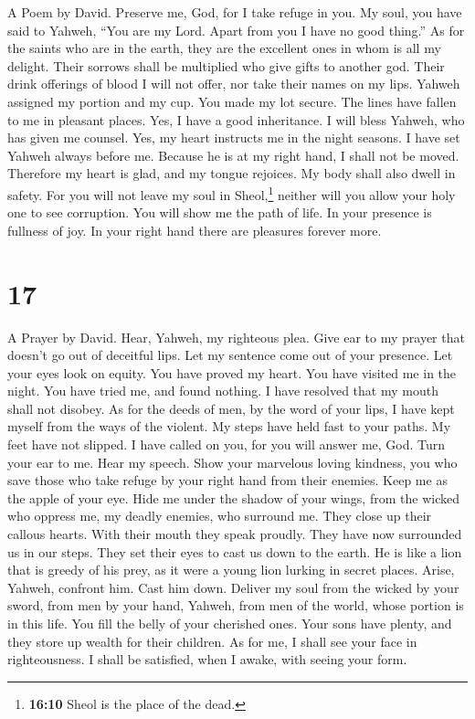 A Poem by David.  Preserve me, God, for I take refuge in
you.  My soul, you have said to Yahweh, ``You are my Lord.
Apart from you I have no good thing.''  As for the saints
who are in the earth, they are the excellent ones in whom is all my
delight.  Their sorrows shall be multiplied who give gifts
to another god. Their drink offerings of blood I will not offer, nor
take their names on my lips.  Yahweh assigned my portion
and my cup. You made my lot secure.  The lines have fallen
to me in pleasant places. Yes, I have a good inheritance. 
I will bless Yahweh, who has given me counsel. Yes, my heart instructs
me in the night seasons.  I have set Yahweh always before
me. Because he is at my right hand, I shall not be moved. 
Therefore my heart is glad, and my tongue rejoices. My body shall also
dwell in safety.  For you will not leave my soul in
Sheol,\footnote{\textbf{16:10} Sheol is the place of the dead.} neither
will you allow your holy one to see corruption.  You will
show me the path of life. In your presence is fullness of joy. In your
right hand there are pleasures forever more.

\hypertarget{section-16}{%
\section{17}\label{section-16}}

A Prayer by David.  Hear, Yahweh, my righteous plea. Give
ear to my prayer that doesn't go out of deceitful lips. 
Let my sentence come out of your presence. Let your eyes look on equity.
 You have proved my heart. You have visited me in the
night. You have tried me, and found nothing. I have resolved that my
mouth shall not disobey.  As for the deeds of men, by the
word of your lips, I have kept myself from the ways of the violent.
 My steps have held fast to your paths. My feet have not
slipped.  I have called on you, for you will answer me,
God. Turn your ear to me. Hear my speech.  Show your
marvelous loving kindness, you who save those who take refuge by your
right hand from their enemies.  Keep me as the apple of
your eye. Hide me under the shadow of your wings,  from
the wicked who oppress me, my deadly enemies, who surround me.
 They close up their callous hearts. With their mouth
they speak proudly.  They have now surrounded us in our
steps. They set their eyes to cast us down to the earth. 
He is like a lion that is greedy of his prey, as it were a young lion
lurking in secret places.  Arise, Yahweh, confront him.
Cast him down. Deliver my soul from the wicked by your sword,
 from men by your hand, Yahweh, from men of the world,
whose portion is in this life. You fill the belly of your cherished
ones. Your sons have plenty, and they store up wealth for their
children.  As for me, I shall see your face in
righteousness. I shall be satisfied, when I awake, with seeing your
form.

